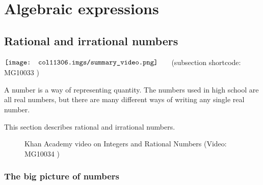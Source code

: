 \chapter{Algebraic expressions}
\section{Rational and irrational numbers}
\setcounter{figure}{1}
\setcounter{subfigure}{1}
\label{m38348}
\nopagebreak
\label{m38348*cid2} $ \hspace{-5pt}\begin{array}{cccccccccccc}   \texttt{[image: col11306.imgs/summary\_video.png]} &   \end{array} $ \hspace{2 pt}\raisebox{-5 pt}{} {(subsection shortcode: MG10033 )} \par 
\label{m38348*id62184}A number is a way of representing quantity. The numbers used in high school are all real numbers, but there are many different ways of writing any single real number.\par 
\label{m38348*id62191}This section describes rational and irrational numbers.\par \label{m38348*eip-195}
\setcounter{subfigure}{0}
\begin{figure}[H] %
\textnormal{Khan Academy video on Integers and Rational Numbers}\vspace{.1in} \nopagebreak
\label{m38348*yt-media1}\label{m38348*yt-video1}
 { (Video:  MG10034 )}
\vspace{2pt}
\vspace{.1in}
\end{figure}       

\par 
\subsection*{The big picture of numbers}

